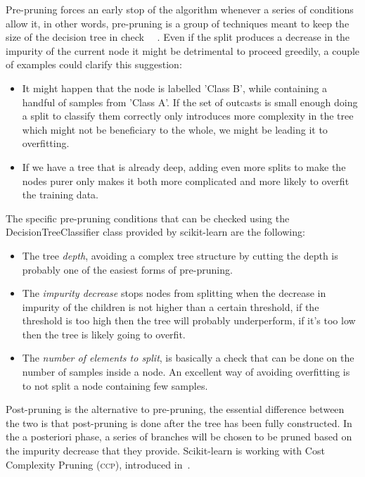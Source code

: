 \medskip

Pre-pruning forces an early stop of the algorithm whenever a series of conditions allow it, in other
words, pre-pruning is a group of techniques meant to keep the size of the decision tree in check
\cite{ZhouZhi-Hua2021ML}~\cite{bramer2007principles}~\cite{fisher1996learning}. Even if the split
produces a decrease in the impurity of the current node it might be detrimental to proceed greedily,
a couple of examples could clarify this suggestion:
\begin{itemize}
	\item It might happen that the node is labelled 'Class B', while containing a handful of
		samples from 'Class A'. If the set of outcasts is small enough doing a split to
		classify them correctly only introduces more complexity in the tree which might not
		be beneficiary to the whole, we might be leading it to overfitting.

	\item If we have a tree that is already deep, adding even more splits to make the nodes purer
		only makes it both more complicated and more likely to overfit the training data.
\end{itemize}

The specific pre-pruning conditions that can be checked using the DecisionTreeClassifier class provided by
scikit-learn are the following:
\begin{itemize}
	\item The tree \emph{depth}, avoiding a complex tree structure by cutting the depth is
	      probably one of the easiest forms of pre-pruning.
	\item The \emph{impurity decrease} stops nodes from splitting when the decrease in impurity
	      of the children is not higher than a certain threshold, if the threshold is too high
	      then the tree will probably underperform, if it's too low then the tree is likely going to
	      overfit.
	\item The \emph{number of elements to split}, is basically a check that can be done on the
	      number of samples inside a node. An excellent way of avoiding overfitting is to not split a node containing few samples.
\end{itemize}

\medskip

Post-pruning is the alternative to pre-pruning, the essential difference between the two is that
post-pruning is done after the tree has been fully constructed. In the a posteriori phase,
a series of branches will be chosen to be pruned based on the impurity decrease that they provide.
Scikit-learn is working with Cost Complexity Pruning (\textsc{ccp}), introduced in~\cite{breiman1984classification}.

